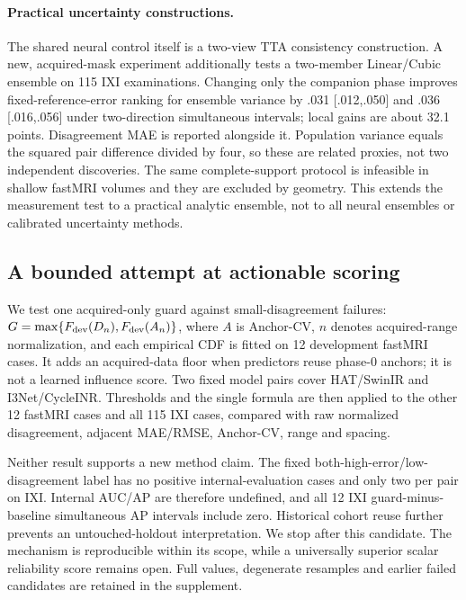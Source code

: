 \documentclass[10pt,twocolumn,letterpaper]{article}
\begin{document}
\paragraph{Practical uncertainty constructions.}
The shared neural control itself is a two-view TTA consistency construction. A new, acquired-mask experiment additionally tests a two-member Linear/Cubic ensemble on 115 IXI examinations. Changing only the companion phase improves fixed-reference-error ranking for ensemble variance by .031 [.012,.050] and .036 [.016,.056] under two-direction simultaneous intervals; local gains are about 32.1 points. Disagreement MAE is reported alongside it. Population variance equals the squared pair difference divided by four, so these are related proxies, not two independent discoveries. The same complete-support protocol is infeasible in shallow fastMRI volumes and they are excluded by geometry. This extends the measurement test to a practical analytic ensemble, not to all neural ensembles or calibrated uncertainty methods.

\subsection{A bounded attempt at actionable scoring}
We test one acquired-only guard against small-disagreement failures: $G=\max\{F_{\rm dev}(D_n),F_{\rm dev}(A_n)\}$, where $A$ is Anchor-CV, $n$ denotes acquired-range normalization, and each empirical CDF is fitted on 12 development fastMRI cases. It adds an acquired-data floor when predictors reuse phase-0 anchors; it is not a learned influence score. Two fixed model pairs cover HAT/SwinIR and I3Net/CycleINR. Thresholds and the single formula are then applied to the other 12 fastMRI cases and all 115 IXI cases, compared with raw normalized disagreement, adjacent MAE/RMSE, Anchor-CV, range and spacing.

Neither result supports a new method claim. The fixed both-high-error/low-disagreement label has no positive internal-evaluation cases and only two per pair on IXI. Internal AUC/AP are therefore undefined, and all 12 IXI guard-minus-baseline simultaneous AP intervals include zero. Historical cohort reuse further prevents an untouched-holdout interpretation. We stop after this candidate. The mechanism is reproducible within its scope, while a universally superior scalar reliability score remains open. Full values, degenerate resamples and earlier failed candidates are retained in the supplement.
\end{document}
